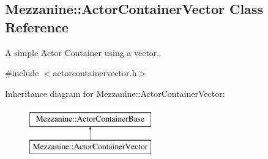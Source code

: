 \hypertarget{classMezzanine_1_1ActorContainerVector}{
\subsection{Mezzanine::ActorContainerVector Class Reference}
\label{classMezzanine_1_1ActorContainerVector}
}


A simple Actor Container using a vector.  




{\ttfamily \#include $<$actorcontainervector.h$>$}

Inheritance diagram for Mezzanine::ActorContainerVector:\begin{figure}[H]
\begin{center}
\leavevmode
\includegraphics[height=2.000000cm]{classMezzanine_1_1ActorContainerVector}
\end{center}
\end{figure}
